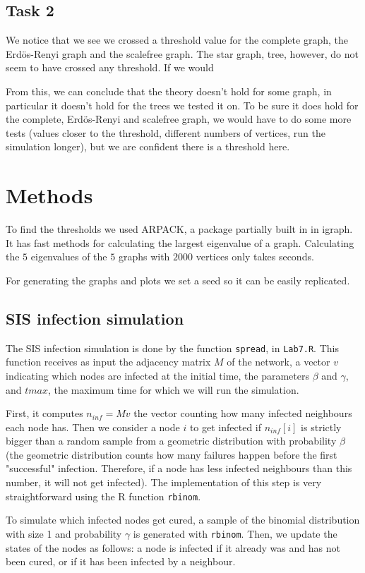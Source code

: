 \documentclass[paper=a4, fontsize=11pt]{scrartcl} %
\begin{document}
\subsection{Task 2}
We notice that we see we crossed a threshold value for the complete graph, the Erdös-Renyi graph and the scalefree graph. The star graph, tree, however, do not seem to have crossed any threshold. If we would 

From this, we can conclude that the theory doesn't hold for some graph, in particular it doesn't hold for the trees we tested it on. To be sure it does hold for the complete, Erdös-Renyi and scalefree graph, we would have to do some more tests (values closer to the threshold, different numbers of vertices, run the simulation longer), but we are confident there is a threshold here.

\section{Methods}
To find the thresholds we used ARPACK, a package partially built in in igraph. It has fast methods for calculating the largest eigenvalue of a graph. Calculating the $5$ eigenvalues of the $5$ graphs with $2000$ vertices only takes seconds.

For generating the graphs and plots we set a seed so it can be easily replicated.

\subsection{SIS infection simulation}
The SIS infection simulation is done by the function \texttt{spread}, in \texttt{Lab7.R}. This function receives as input the adjacency matrix $M$ of the network, a vector $v$ indicating which nodes are infected at the initial time, the parameters $\beta$ and $\gamma$, and $tmax$, the maximum time for which we will run the simulation. 

First, it computes $n_{inf}=M v$ the vector counting how many infected neighbours each node has. Then we consider a node $i$ to get infected if $n_{inf}[i]$ is strictly bigger than a random sample from a geometric distribution with probability $\beta$ (the geometric distribution counts how many failures happen before the first "successful" infection. Therefore, if a node has less infected neighbours than this number, it will not get infected). The implementation of this step is very straightforward using the R function \texttt{rbinom}.

To simulate which infected nodes get cured, a sample of the binomial distribution with size 1 and probability $\gamma$ is generated with \texttt{rbinom}. Then, we update the states of the nodes as follows: a node is infected if it already was and has not been cured, or if it has been infected by a neighbour.
\end{document}
